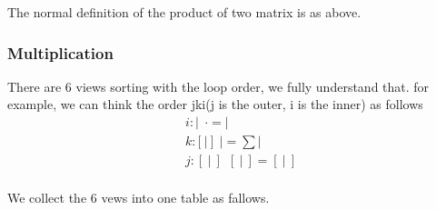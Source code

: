 \documentclass[UTF8]{../../09-Mathematics}
\begin{document}
The normal definition of the product of two matrix is as above. 



\subsubsection{Multiplication}


There are 6 views sorting with the loop order, we fully understand that. for example, we can think the order jki(j is the outer, i is the inner) as follows
\begin{equation}
    \begin{split}
    &i: | \ \ \cdot = | \\
    &k: [\ | \ ]  \ \ | =  \sum|  \\
    &j:  [\ | \ ]  \ \  [\ | \ ]=  [\ | \ ]\\
\end{split}
\end{equation}


We collect the 6 vews into one table as fallows.
\end{document}
